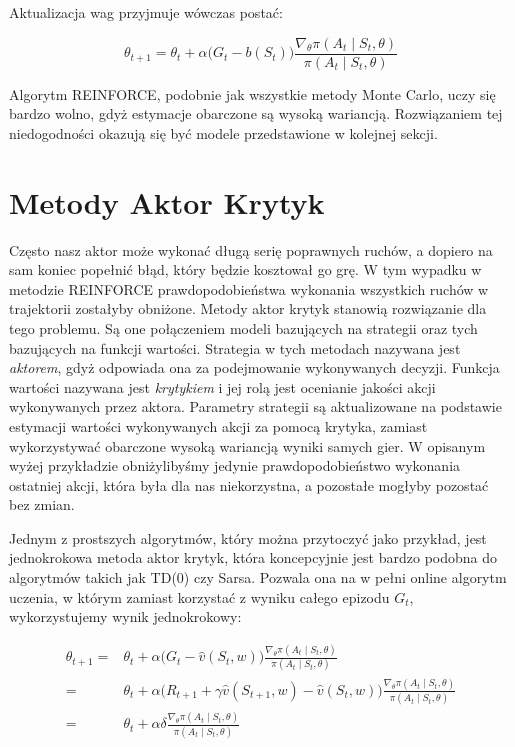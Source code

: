 \documentclass[licencjacka]{pracamgr}
\begin{document}
Aktualizacja wag przyjmuje wówczas postać:

$$ \theta_{t+1} = \theta_t + \alpha \Big( G_t - b(S_t) \Big) \frac{\nabla_\theta \pi(A_t \mid S_t, \theta)}{\pi(A_t \mid S_t, \theta)} $$


Algorytm REINFORCE, podobnie jak wszystkie metody Monte Carlo, uczy się bardzo wolno, gdyż estymacje obarczone są wysoką wariancją. Rozwiązaniem tej niedogodności okazują się być modele przedstawione w kolejnej sekcji.

\section{Metody Aktor Krytyk}

Często nasz aktor może wykonać długą serię poprawnych ruchów, a dopiero na sam koniec popełnić błąd, który będzie kosztował go grę. W tym wypadku w metodzie REINFORCE prawdopodobieństwa wykonania wszystkich ruchów w trajektorii zostałyby obniżone. Metody aktor krytyk stanowią rozwiązanie dla tego problemu. Są one połączeniem modeli bazujących na strategii oraz tych bazujących na funkcji wartości. Strategia w tych metodach nazywana jest \emph{aktorem}, gdyż odpowiada ona za podejmowanie wykonywanych decyzji. Funkcja wartości nazywana jest \emph{krytykiem} i jej rolą jest ocenianie jakości akcji wykonywanych przez aktora. Parametry strategii są aktualizowane na podstawie estymacji wartości wykonywanych akcji za pomocą krytyka, zamiast wykorzystywać obarczone wysoką wariancją wyniki samych gier. W opisanym wyżej przykładzie obniżylibyśmy jedynie prawdopodobieństwo wykonania ostatniej akcji, która była dla nas niekorzystna, a pozostałe mogłyby pozostać bez zmian.

Jednym z prostszych algorytmów, który można przytoczyć jako przykład, jest jednokrokowa metoda aktor krytyk, która koncepcyjnie jest bardzo podobna do algorytmów takich jak TD(0) czy Sarsa. Pozwala ona na w pełni online algorytm uczenia, w którym zamiast korzystać z wyniku całego epizodu $G_t$, wykorzystujemy wynik jednokrokowy:

\begin{align*}
\theta_{t+1} =& \theta_t + \alpha \Big( G_t - \hat{v}(S_t, w) \Big) \frac{\nabla_\theta \pi(A_t \mid S_t, \theta)}{\pi(A_t \mid S_t, \theta)} \\
=& \theta_t + \alpha \Big( R_{t+1} + \gamma \hat{v}(S_{t+1}, w) - \hat{v}(S_t, w) \Big) \frac{\nabla_\theta \pi(A_t \mid S_t, \theta)}{\pi(A_t \mid S_t, \theta)} \\
=& \theta_t + \alpha \delta \frac{\nabla_\theta \pi(A_t \mid S_t, \theta)}{\pi(A_t \mid S_t, \theta)}
\end{align*}
\end{document}
